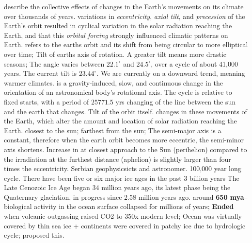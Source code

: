          describe the collective effects of changes in the Earth's movements on its climate over thousands of years. variations in \textit{eccentricity}, \textit{axial tilt}, and \textit{precession} of the Earth's orbit resulted in cyclical variation in the solar radiation reaching the Earth, and that this \textit{orbital forcing} strongly influenced climatic patterns on Earth.
          refers to the earths orbit and its shift from being circular to more elliptical over time;
        Tilt of earths axis of rotation. A greater tilt means more drastic seasons; The angle varies between $22.1^\circ$ and $24.5^\circ$, over a cycle of about 41,000 years. The current tilt is $23.44^\circ$. We are currently on a downward trend, meaning warmer climates.
         is a gravity-induced, slow, and continuous change in the orientation of an astronomical body's rotational axis. The cycle is relative to fixed starts, with a period of $25771.5$ yrs
        changing of the line between the sun and the earth that changes. Tilt of the orbit itself. 
        changes in these movements of the Earth, which alter the amount and location of solar radiation reaching the Earth.
        closest to the sun; farthest from the sun; The semi-major axis is a constant, therefore when the earth orbit becomes more eccentric, the semi-minor axis shortens. Increase in at closest approach to the Sun (perihelion) compared to the irradiation at the furthest distance (aphelion) is slightly larger than four times the eccentricity.
         Serbian geophysicsicts and astronomer.
        \ddd {}100,000 year long cycle. 
    	There have been five or six major ice ages in the past 3 billion years
    	The Late Cenozoic Ice Age began 34 million years ago, its latest phase being the Quaternary glaciation, in progress since 2.58 million years ago. 
             around \textbf{650 mya}--biological activity in the ocean surface collapsed for millions of years; \textbf{Ended} when volcanic outgassing raised CO2 to 350x modern level; Ocean was virtually covered by thin sea ice + continents were covered in patchy ice due to hydrologic cycle;  proposed this. 
